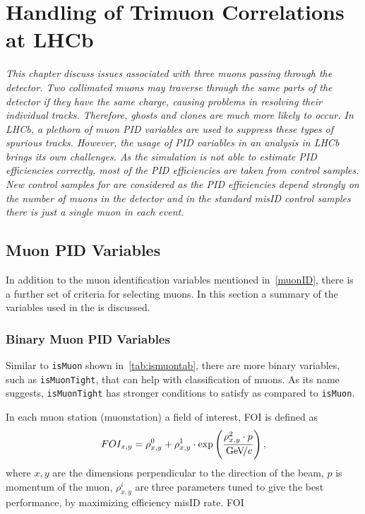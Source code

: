 \chapter{Handling of Trimuon Correlations at LHCb}
\label{chap:trimuon}


\textit{This chapter discuss issues associated with three muons passing through the detector. Two collimated muons may traverse through the same parts of the detector if they have the same charge, causing problems in resolving their individual tracks. Therefore, ghosts and clones are much more likely to occur. In LHCb, a plethora of muon \Gls{PID} variables are used to suppress these types of spurious tracks. However, the usage of \gls{PID} variables in an analysis in \gls{LHCb} brings its own challenges. As the simulation is not able to estimate \gls{PID} efficiencies correctly, most of the \gls{PID} efficiencies are taken from control samples. New control samples for \Bmumumu are considered as the \Gls{PID} efficiencies depend strongly on the number of muons in the detector and in the standard misID control samples there is just a single muon in each event.}

\color{black}

\section{Muon PID Variables}
\label{otherpid}
In addition to the muon identification variables mentioned in~\autoref{muonID}, there is a further set of criteria for selecting muons. In this section a summary of the variables used in the \DIFdelbegin {}\DIFdelend \Bmumumu \DIFaddbegin {}\DIFaddend is discussed.

\subsection{Binary Muon PID Variables }
Similar to \texttt{isMuon} shown in~\autoref{tab:ismuontab}, there are more binary variables, such as \texttt{isMuonTight}, that can help with \DIFaddbegin {}\DIFaddend classification of muons. As its name suggests, \texttt{isMuonTight} has stronger conditions to satisfy as compared to \texttt{isMuon}. 

In each muon station (\gls{muonstation}) a field of interest, \gls{FOI} is defined as %
\begin{equation}
	FOI_{x,y}=\rho^{0}_{x,y}+\rho^{1}_{x,y}\cdot \exp \left(\frac{\rho^{2}_{x,y}\cdot p}{{\mathrm{\,Ge\kern -0.1em V\!/}c}} \right),
\end{equation}
where $x,y$ are the dimensions perpendicular to the direction of the beam, $p$ is \DIFaddbegin {}\DIFaddend momentum of the muon, $\rho^{i}_{x,y}$ are three \DIFdelbegin {}\DIFdelend \DIFaddbegin {}\DIFaddend parameters tuned to give the best performance, by maximizing efficiency \DIFdelbegin {}\DIFdelend \DIFaddbegin {}\DIFaddend misID rate. \DIFaddbegin {}\gls{FOI} \DIFaddend 


